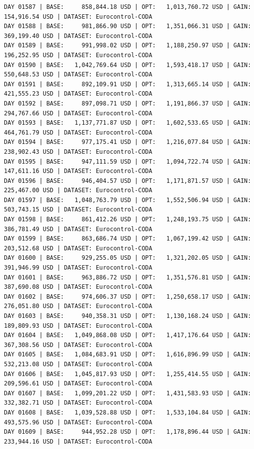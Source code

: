 \documentclass[11pt,a4paper]{article}
\begin{document}
\begin{verbatim}
DAY 01587 | BASE:     858,844.18 USD | OPT:   1,013,760.72 USD | GAIN: 154,916.54 USD | DATASET: Eurocontrol-CODA
DAY 01588 | BASE:     981,866.90 USD | OPT:   1,351,066.31 USD | GAIN: 369,199.40 USD | DATASET: Eurocontrol-CODA
DAY 01589 | BASE:     991,998.02 USD | OPT:   1,188,250.97 USD | GAIN: 196,252.95 USD | DATASET: Eurocontrol-CODA
DAY 01590 | BASE:   1,042,769.64 USD | OPT:   1,593,418.17 USD | GAIN: 550,648.53 USD | DATASET: Eurocontrol-CODA
DAY 01591 | BASE:     892,109.91 USD | OPT:   1,313,665.14 USD | GAIN: 421,555.23 USD | DATASET: Eurocontrol-CODA
DAY 01592 | BASE:     897,098.71 USD | OPT:   1,191,866.37 USD | GAIN: 294,767.66 USD | DATASET: Eurocontrol-CODA
DAY 01593 | BASE:   1,137,771.87 USD | OPT:   1,602,533.65 USD | GAIN: 464,761.79 USD | DATASET: Eurocontrol-CODA
DAY 01594 | BASE:     977,175.41 USD | OPT:   1,216,077.84 USD | GAIN: 238,902.43 USD | DATASET: Eurocontrol-CODA
DAY 01595 | BASE:     947,111.59 USD | OPT:   1,094,722.74 USD | GAIN: 147,611.16 USD | DATASET: Eurocontrol-CODA
DAY 01596 | BASE:     946,404.57 USD | OPT:   1,171,871.57 USD | GAIN: 225,467.00 USD | DATASET: Eurocontrol-CODA
DAY 01597 | BASE:   1,048,763.79 USD | OPT:   1,552,506.94 USD | GAIN: 503,743.15 USD | DATASET: Eurocontrol-CODA
DAY 01598 | BASE:     861,412.26 USD | OPT:   1,248,193.75 USD | GAIN: 386,781.49 USD | DATASET: Eurocontrol-CODA
DAY 01599 | BASE:     863,686.74 USD | OPT:   1,067,199.42 USD | GAIN: 203,512.68 USD | DATASET: Eurocontrol-CODA
DAY 01600 | BASE:     929,255.05 USD | OPT:   1,321,202.05 USD | GAIN: 391,946.99 USD | DATASET: Eurocontrol-CODA
DAY 01601 | BASE:     963,886.72 USD | OPT:   1,351,576.81 USD | GAIN: 387,690.08 USD | DATASET: Eurocontrol-CODA
DAY 01602 | BASE:     974,606.37 USD | OPT:   1,250,658.17 USD | GAIN: 276,051.80 USD | DATASET: Eurocontrol-CODA
DAY 01603 | BASE:     940,358.31 USD | OPT:   1,130,168.24 USD | GAIN: 189,809.93 USD | DATASET: Eurocontrol-CODA
DAY 01604 | BASE:   1,049,868.08 USD | OPT:   1,417,176.64 USD | GAIN: 367,308.56 USD | DATASET: Eurocontrol-CODA
DAY 01605 | BASE:   1,084,683.91 USD | OPT:   1,616,896.99 USD | GAIN: 532,213.08 USD | DATASET: Eurocontrol-CODA
DAY 01606 | BASE:   1,045,817.93 USD | OPT:   1,255,414.55 USD | GAIN: 209,596.61 USD | DATASET: Eurocontrol-CODA
DAY 01607 | BASE:   1,099,201.22 USD | OPT:   1,431,583.93 USD | GAIN: 332,382.71 USD | DATASET: Eurocontrol-CODA
DAY 01608 | BASE:   1,039,528.88 USD | OPT:   1,533,104.84 USD | GAIN: 493,575.96 USD | DATASET: Eurocontrol-CODA
DAY 01609 | BASE:     944,952.28 USD | OPT:   1,178,896.44 USD | GAIN: 233,944.16 USD | DATASET: Eurocontrol-CODA

\end{verbatim}
\end{document}
